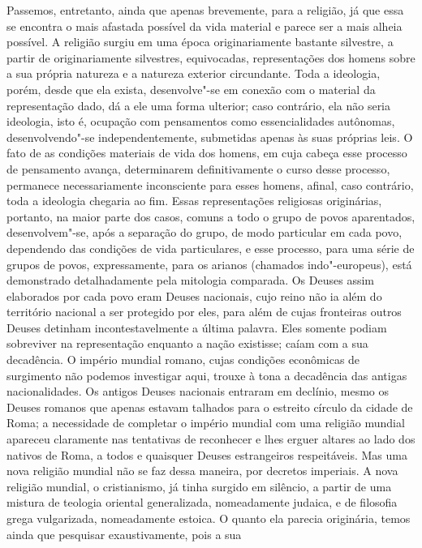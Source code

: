 Passemos, entretanto, ainda que apenas brevemente, para a religião, já
que essa se encontra o mais afastada possível da vida material e parece
ser a mais alheia possível. A religião surgiu em uma época
originariamente bastante silvestre, a partir 
de originariamente silvestres, equivocadas, representações dos homens
sobre a sua própria natureza e a natureza exterior circundante. Toda a
ideologia, porém, desde que ela exista, desenvolve"-se em conexão com o
material da representação dado, dá a ele uma forma ulterior; caso
contrário, ela não seria ideologia, isto é, ocupação com pensamentos
como essencialidades autônomas, desenvolvendo"-se independentemente,
submetidas apenas às suas próprias leis. O fato de as condições
materiais de vida dos homens, em cuja cabeça esse processo de pensamento
avança, determinarem definitivamente o curso desse processo, permanece
necessariamente inconsciente para esses homens, afinal, caso contrário,
toda a ideologia chegaria ao fim. Essas representações religiosas
originárias, portanto, na maior parte dos casos, comuns a todo o grupo
de povos aparentados, desenvolvem"-se, após a separação do grupo, de modo
particular em cada povo, dependendo das condições de vida particulares,
e esse processo, para uma série de grupos de povos, expressamente, para
os arianos (chamados indo"-europeus), está demonstrado detalhadamente
pela mitologia comparada. Os Deuses assim elaborados por cada povo eram
Deuses nacionais, cujo reino não ia além do território nacional a ser
protegido por eles, para além de cujas fronteiras outros Deuses detinham
incontestavelmente a última palavra. Eles somente podiam sobreviver na
representação enquanto a nação existisse; caíam com a sua decadência. O
império mundial romano, cujas condições econômicas de surgimento não
podemos investigar aqui, trouxe à tona a decadência das antigas
nacionalidades. Os antigos Deuses nacionais entraram em declínio, mesmo
os Deuses romanos que apenas estavam talhados para o estreito círculo da
cidade de Roma; a necessidade de completar o império mundial com uma
religião mundial apareceu claramente nas tentativas de reconhecer e lhes
erguer altares ao lado dos nativos de Roma, a todos e quaisquer Deuses
estrangeiros respeitáveis. Mas uma nova religião mundial não se faz
dessa maneira, por decretos imperiais. A nova religião mundial, o
cristianismo, já tinha surgido em silêncio, a partir de uma mistura de
teologia oriental generalizada, nomeadamente judaica, e de filosofia
grega vulgarizada, nomeadamente estoica. O quanto ela parecia
originária, temos ainda que pesquisar exaustivamente, pois a sua
